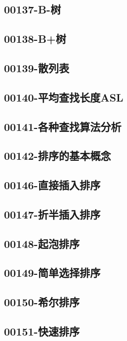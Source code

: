 \subsection{00137-B-树}

\subsection{00138-B+树}

\subsection{00139-散列表}

\subsection{00140-平均查找长度ASL}

\subsection{00141-各种查找算法分析}

\subsection{00142-排序的基本概念}

\subsection{00146-直接插入排序}

\subsection{00147-折半插入排序}

\subsection{00148-起泡排序}

\subsection{00149-简单选择排序}

\subsection{00150-希尔排序}

\subsection{00151-快速排序}

